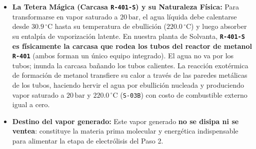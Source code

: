 \documentclass[11pt,a4paper]{article}
\begin{document}
\begin{itemize}
    \item \textbf{La Tetera Mágica (Carcasa \texttt{R-401-S}) y su Naturaleza Física:} Para transformarse en vapor saturado a $20\,\text{bar}$, el agua líquida debe calentarse desde $30.9\,^\circ\text{C}$ hasta su temperatura de ebullición ($220.0\,^\circ\text{C}$) y luego absorber su entalpía de vaporización latente. En nuestra planta de Solvanta, \textbf{\texttt{R-401-S} es físicamente la carcasa que rodea los tubos del reactor de metanol \texttt{R-401}} (ambos forman un único equipo integrado). El agua no va por los tubos; inunda la carcasa bañando los tubos calientes. La reacción exotérmica de formación de metanol transfiere su calor a través de las paredes metálicas de los tubos, haciendo hervir el agua por ebullición nucleada y produciendo vapor saturado a $20\,\text{bar}$ y $220.0\,^\circ\text{C}$ (\texttt{S-03B}) con costo de combustible externo igual a cero.
    
    \item \textbf{Destino del vapor generado:} Este vapor generado \textbf{no se disipa ni se ventea}: constituye la materia prima molecular y energética indispensable para alimentar la etapa de electrólisis del Paso 2.
\end{itemize}
\end{document}
